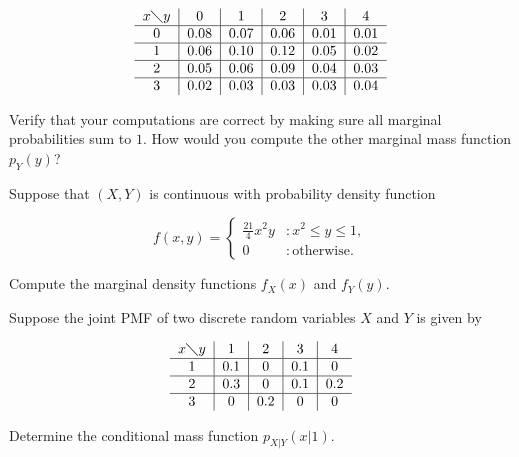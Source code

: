 \documentclass[12pt,reqno]{amsart}
\begin{document}
\[\begin{tabular}{c|c|c|c|c|c}
$x \diagdown y$ & 0 & 1 & 2 & 3 & 4  \\ \hline
0 & 0.08 & 0.07 & 0.06 & 0.01 & 0.01 \\ \hline
1 & 0.06 & 0.10 & 0.12 & 0.05 & 0.02 \\ \hline
2 & 0.05 & 0.06 & 0.09 & 0.04 & 0.03 \\ \hline
3 & 0.02 & 0.03 & 0.03 & 0.03 & 0.04 
\end{tabular}\]

\medskip
Verify that your computations are correct by making sure all marginal probabilities sum to $1$. How would you compute the other marginal mass function $p_Y(y)$?\vfill













\bigskip
\prob Suppose that $(X,Y)$ is continuous with probability density function

\[f(x,y) = \begin{cases}
    \frac{21}{4}x^2 y & : x^2 \leq y \leq 1, \\
    0 & : \text{otherwise}.
\end{cases}\]

Compute the marginal density functions $f_X(x)$ and $f_Y(y)$.\vfill






















\bigskip
\prob Suppose the joint PMF of two discrete random variables $X$ and $Y$ is given by

\[\begin{tabular}{c|c|c|c|c}
    $x \diagdown y$ & 1 & 2 & 3 & 4 \\ \hline 
    1 & 0.1 & 0 & 0.1 & 0\\ \hline
    2 & 0.3 & 0 & 0.1 & 0.2 \\ \hline
    3 & 0 & 0.2 & 0 & 0
    \end{tabular}\]

Determine the conditional mass function $p_{X|Y}(x|1)$.\vfill
\end{document}
